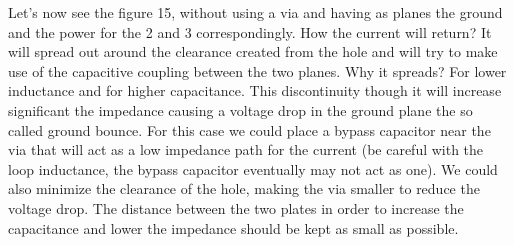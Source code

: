\documentclass[final]{cubedoc}
\begin{document}
	Let's now see the figure 15, without using a via and having as planes the ground and the power for the 2 and 3 correspondingly. How the current will return? It will spread out around the clearance created from the hole and will try to make use of the capacitive coupling between the two planes. Why it spreads? For lower inductance and for higher capacitance. This discontinuity though it will increase significant the impedance causing a voltage drop in the ground plane the so called ground bounce. For this case we could place a bypass capacitor near the via that will act as a low impedance path for the current (be careful with the loop inductance, the bypass capacitor eventually may not act as one). We could also minimize the clearance of the hole, making the via smaller to reduce the voltage drop. The distance between the two plates in order to increase the capacitance and lower the impedance should be kept as small as possible.
	
\end{document}
